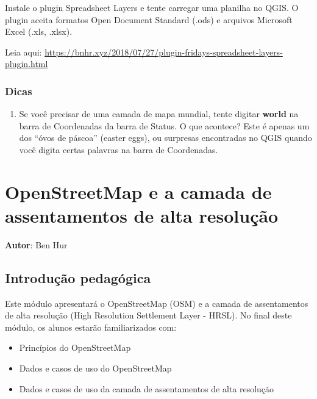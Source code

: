 \documentclass[
  portuguese,
]{krantz}
\providecommand{\tightlist}{%
  \setlength{\itemsep}{0pt}\setlength{\parskip}{0pt}}
\begin{document}
Instale o plugin Spreadsheet Layers e tente carregar uma planilha no QGIS. O plugin aceita formatos Open Document Standard (.ods) e arquivos Microsoft Excel (.xls, .xlsx).

Leia aqui: \href{https://bnhr.xyz/2018/07/27/plugin-fridays-spreadsheet\%20-layers-plugin.html}{https://bnhr.xyz/2018/07/27/plugin-fridays-spreadsheet-layers-plugin.html}

\hypertarget{dicas}{%
\subsection{Dicas}\label{dicas}}

\begin{enumerate}
\def\labelenumi{\arabic{enumi}.}
\tightlist
\item
  Se você precisar de uma camada de mapa mundial, tente digitar \textbf{world} na barra de Coordenadas da barra de Status. O que acontece? Este é apenas um dos ``óvos de páscoa'' (easter eggs), ou surpresas encontradas no QGIS quando você digita certas palavras na barra de Coordenadas.
\end{enumerate}

\hypertarget{openstreetmap-e-a-camada-de-assentamentos-de-alta-resoluuxe7uxe3o}{%
\chapter{OpenStreetMap e a camada de assentamentos de alta resolução}\label{openstreetmap-e-a-camada-de-assentamentos-de-alta-resoluuxe7uxe3o}}

\textbf{Autor}: Ben Hur

\hypertarget{introduuxe7uxe3o-pedaguxf3gica-3}{%
\section{Introdução pedagógica}\label{introduuxe7uxe3o-pedaguxf3gica-3}}

Este módulo apresentará o OpenStreetMap (OSM) e a camada de assentamentos de alta resolução (High Resolution Settlement Layer - HRSL). No final deste módulo, os alunos estarão familiarizados com:

\begin{itemize}
\tightlist
\item
  Princípios do OpenStreetMap
\item
  Dados e casos de uso do OpenStreetMap
\item
  Dados e casos de uso da camada de assentamentos de alta resolução
\end{itemize}
\end{document}

